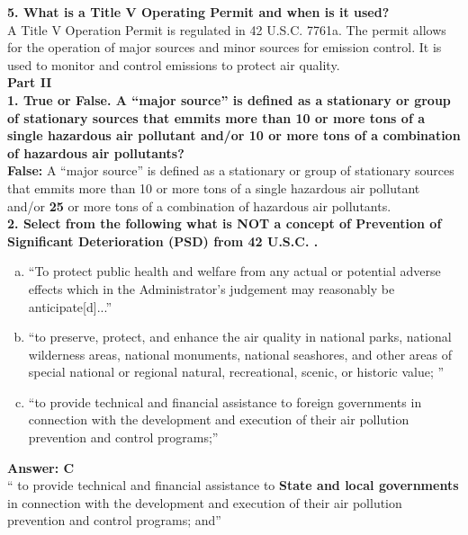 \documentclass[12pt]{article}
\begin{document}
\textbf{5. What is a Title V Operating Permit and when is it used?} \\
A Title V Operation Permit is regulated in 42 U.S.C. \textsection 7761a. The permit allows for the operation of major sources and minor sources for emission control. It is used to monitor and control emissions to protect air quality. \\

\textbf{Part II} \\

\textbf{1. True or False. A ``major source'' is defined as a stationary or group of stationary sources that emmits more than 10 or more tons of a single hazardous air pollutant and/or 10 or more tons of a combination of hazardous air pollutants?} \\

\textbf{False:}
A ``major source'' is defined as a stationary or group of stationary sources that emmits more than 10 or more tons of a single hazardous air pollutant and/or \textbf{25} or more tons of a combination of hazardous air pollutants. \\

\textbf{2. Select from the following what is NOT a concept of Prevention of Significant Deterioration (PSD) from 42 U.S.C. .} 

\begin{enumerate}[a.]
    \item ``To protect public health and welfare from any actual or potential adverse effects which in the Administrator's judgement may reasonably be anticipate[d]...''
    \item ``to preserve, protect, and enhance the air quality in national parks, national wilderness areas, national monuments, national seashores, and other areas of special national or regional natural, recreational, scenic, or historic value; ''
    \item ``to provide technical and financial assistance to foreign governments in connection with the development and execution of their air pollution prevention and control programs;''
\end{enumerate}

\textbf{Answer: C} \\
`` to provide technical and financial assistance to \textbf{State and local governments} in connection with the development and execution of their air pollution prevention and control programs; and''

\newpage
\printbibliography
\end{document}
